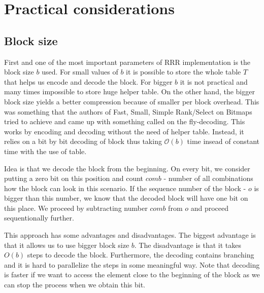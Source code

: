 \section{Practical considerations}

\subsection{Block size}

First and one of the most important parameters of RRR implementation is the block
size $b$ used. For small values of $b$ it is possible to store the whole table
$T$ that helps us encode and decode the block. For bigger $b$ it is not practical
and many times impossible to store huge helper table. On the other hand, the bigger
block size yields a better compression because of smaller per block overhead. This was
something that the authors of Fast, Small, Simple Rank/Select on Bitmaps tried to
achieve and came up with something called on the fly-decoding. This works by encoding
and decoding without the need of helper table. Instead, it relies on a bit by bit decoding
of block thus taking $\mathcal{O}(b)$ time insead of constant time with the use of table.

Idea is that we decode the block from the beginning. On every bit, we consider putting a
zero bit on this position and count $comb$ - number of all combinations how the block can
look in this scenario. If the sequence number of the block - $o$ is bigger than this number,
we know that the decoded block will have one bit on this place. We proceed by subtracting
number $comb$ from $o$ and proceed sequentionally further.

This approach has some advantages and disadvantages. The biggest advantage is that it allows
us to use bigger block size $b$. The disadvantage is that it takes $O(b)$ steps to decode the
block. Furthermore, the decoding contains branching and it is hard to parallelize the steps
in some meaningful way. Note that decoding is faster if we want to access the element
close to the beginning of the block as we can stop the process when we obtain this bit.
